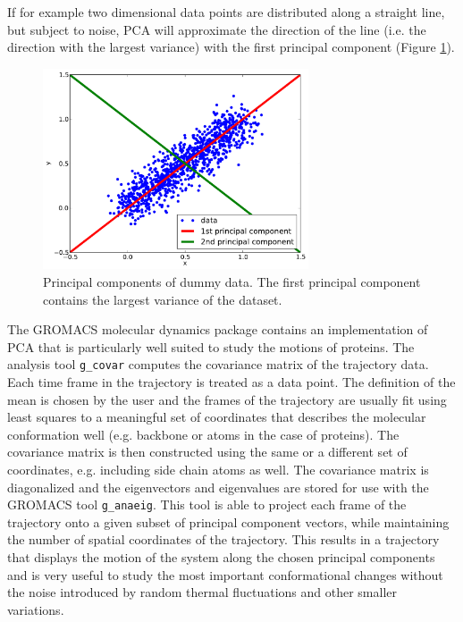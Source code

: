 \documentclass[english, a4paper, 12pt, titlepage, draft]{article}
\begin{document}
If for example two dimensional data points are distributed along a straight line, but subject to noise, PCA will approximate the direction of the line (i.e. the direction with the largest variance) with the first principal component (Figure \ref{fig:PCA}).

\begin{figure}
    \centering
    \includegraphics[width=0.7\textwidth]{figures/PCA_figure/PCA_figure.pdf}
    \caption{Principal components of dummy data. The first principal component contains the largest variance of the dataset.}
    \label{fig:PCA}
\end{figure}         



The GROMACS molecular dynamics package \cite{GROMACS4} contains an implementation of PCA that is particularly well suited to study the motions of proteins.
The analysis tool \texttt{g\_covar} computes the covariance matrix of the trajectory data.
Each time frame in the trajectory is treated as a data point.
The definition of the mean is chosen by the user and the frames of the trajectory are usually fit using least squares to a meaningful set of coordinates that describes the molecular conformation well (e.g. backbone or  atoms in the case of proteins).
The covariance matrix is then constructed using the same or a different set of coordinates, e.g. including side chain atoms as well.
The covariance matrix is diagonalized and the eigenvectors and eigenvalues are stored for use with the GROMACS tool \texttt{g\_anaeig}.
This tool is able to project each frame of the trajectory onto a given subset of principal component vectors, while maintaining the number of spatial coordinates of the trajectory.
This results in a trajectory that displays the motion of the system along the chosen principal components and is very useful to study the most important conformational changes without the noise introduced by random thermal fluctuations and other smaller variations.
\end{document}
